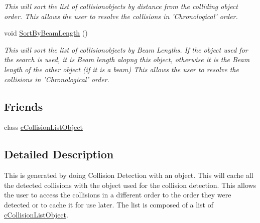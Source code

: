 \begin{DoxyCompactItemize}
\begin{DoxyCompactList}\small\item\em This will sort the list of collisionobjects by distance from the colliding object order. This allows the user to resolve the collisions in 'Chronological' order. \end{DoxyCompactList}\item 
\hypertarget{classc_collision_list_a9577be82cb58bf0989b69aeb7f46483f}{
void \hyperlink{classc_collision_list_a9577be82cb58bf0989b69aeb7f46483f}{SortByBeamLength} ()}
\label{classc_collision_list_a9577be82cb58bf0989b69aeb7f46483f}

\begin{DoxyCompactList}\small\item\em This will sort the list of collisionobjects by Beam Lengths. If the object used for the search is used, it is Beam length alopng this object, otherwise it is the Beam length of the other object (if it is a beam) This allows the user to resolve the collisions in 'Chronological' order. \end{DoxyCompactList}\end{DoxyCompactItemize}
\subsection*{Friends}
\begin{DoxyCompactItemize}
\item 
\hypertarget{classc_collision_list_aabeec129e7ddb55cebb137e0150d99c3}{
class \hyperlink{classc_collision_list_aabeec129e7ddb55cebb137e0150d99c3}{cCollisionListObject}}
\label{classc_collision_list_aabeec129e7ddb55cebb137e0150d99c3}

\end{DoxyCompactItemize}


\subsection{Detailed Description}
This is generated by doing Collision Detection with an object. This will cache all the detected collisions with the object used for the collision detection. This allows the user to access the collisions in a different order to the order they were detected or to cache it for use later. The list is composed of a list of \hyperlink{classc_collision_list_object}{cCollisionListObject}. 